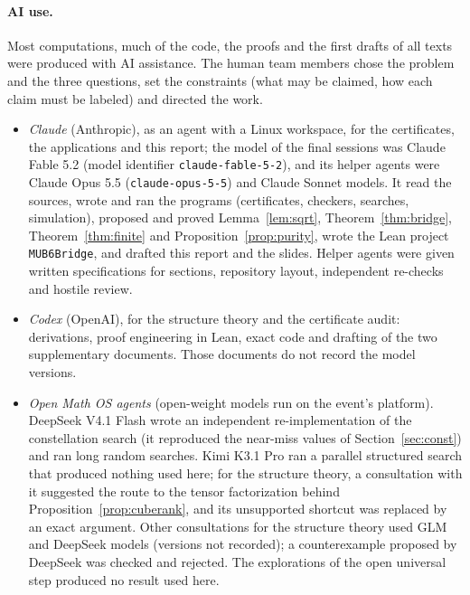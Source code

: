 \documentclass[11pt]{article}
\theoremstyle{definition}
\theoremstyle{remark}
\begin{document}
\paragraph{AI use.} Most computations, much of the code, the proofs and the first drafts of all texts were produced
with AI assistance. The human team members chose the problem and the three questions, set the constraints (what may
be claimed, how each claim must be labeled) and directed the work.
\begin{itemize}
\item \emph{Claude} (Anthropic), as an agent with a Linux workspace, for the certificates, the applications and this report; the model of the final
sessions was Claude Fable 5.2 (model identifier \texttt{claude-fable-5-2}), and its helper agents were Claude Opus 5.5
(\texttt{claude-opus-5-5}) and Claude Sonnet models. It read the
sources, wrote and ran the programs (certificates, checkers, searches, simulation), proposed and proved
Lemma~\ref{lem:sqrt}, Theorem~\ref{thm:bridge}, Theorem~\ref{thm:finite} and Proposition~\ref{prop:purity}, wrote
the Lean project \texttt{MUB6Bridge}, and drafted this report and the slides. Helper agents were given written
specifications for sections, repository layout, independent re-checks and hostile review.
\item \emph{Codex} (OpenAI), for the structure theory and the certificate audit: derivations, proof engineering in Lean, exact code and
drafting of the two supplementary documents. Those documents do not record the model versions.
\item \emph{Open Math OS agents} (open-weight models run on the event's platform). DeepSeek V4.1 Flash wrote an
independent re-implementation of the constellation search (it reproduced the near-miss values of
Section~\ref{sec:const}) and ran long random searches. Kimi K3.1 Pro ran a parallel structured search
that produced nothing used here; for the structure theory, a consultation with it suggested the route to the
tensor factorization behind Proposition~\ref{prop:cuberank}, and its unsupported shortcut was replaced by an exact
argument. Other consultations for the structure theory used GLM and DeepSeek models (versions not recorded); a
counterexample proposed by DeepSeek was checked and rejected. The explorations of the open universal step produced
no result used here.
\end{itemize}
\end{document}
